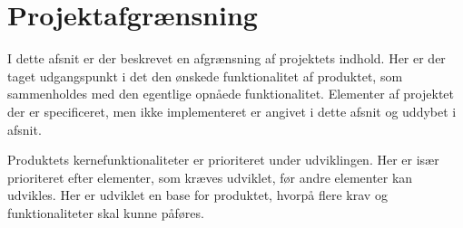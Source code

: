 
\chapter{Projektafgrænsning}
I dette afsnit er der beskrevet en afgrænsning af projektets indhold. Her er der taget udgangspunkt i det den ønskede funktionalitet af produktet, som sammenholdes med den egentlige opnåede funktionalitet. Elementer af projektet der er specificeret, men ikke implementeret er angivet i dette afsnit og uddybet i afsnit. 

Produktets kernefunktionaliteter er prioriteret under udviklingen. Her er især prioriteret efter elementer, som kræves udviklet, før andre elementer kan udvikles. Her er udviklet en base for produktet, hvorpå flere krav og funktionaliteter skal kunne påføres. 

